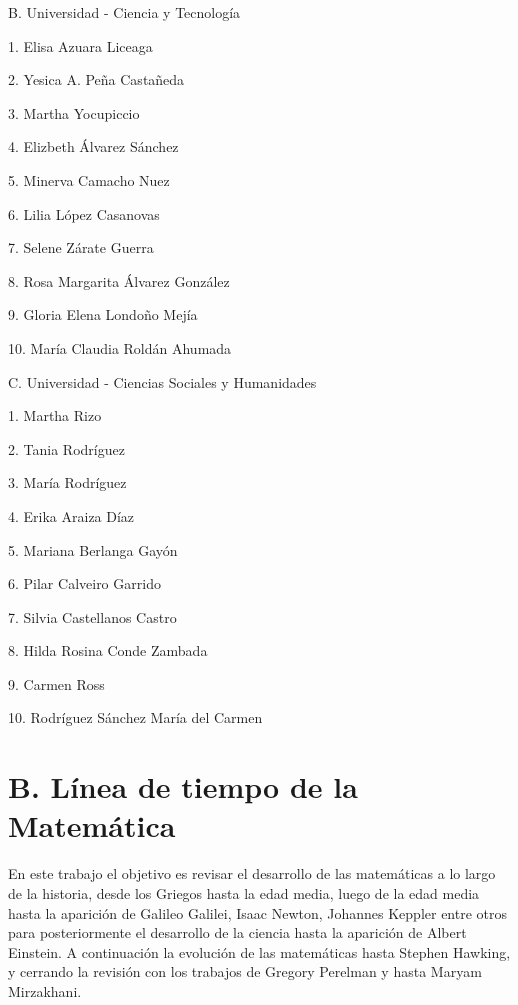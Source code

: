 \documentclass[]{book}
\begin{document}
B. Universidad - Ciencia y Tecnología

\begin{multicols}{2}

      1. Elisa Azuara Liceaga
  
      2. Yesica A. Peña Castañeda
  
      3. Martha Yocupiccio
  
      4. Elizbeth Álvarez Sánchez
  
      5. Minerva Camacho Nuez
  
      6. Lilia López Casanovas
  
      7. Selene Zárate Guerra
  
      8. Rosa Margarita Álvarez González 
  
      9. Gloria Elena Londoño Mejía
  
      10. María Claudia Roldán Ahumada
\end{multicols}

C. Universidad - Ciencias Sociales y Humanidades

\begin{multicols}{2}

      1. Martha Rizo
  
      2. Tania Rodríguez
  
      3. María Rodríguez
  
      4. Erika Araiza Díaz
  
      5. Mariana Berlanga Gayón
  
      6. Pilar Calveiro Garrido
  
      7. Silvia Castellanos Castro
  
      8. Hilda Rosina Conde Zambada
  
      9. Carmen Ross
  
      10. Rodríguez Sánchez María del Carmen
\end{multicols}

\section{B. Línea de tiempo de la
Matemática}\label{b.-luxednea-de-tiempo-de-la-matemuxe1tica}

En este trabajo el objetivo es revisar el desarrollo de las matemáticas
a lo largo de la historia, desde los Griegos hasta la edad media, luego
de la edad media hasta la aparición de Galileo Galilei, Isaac Newton,
Johannes Keppler entre otros para posteriormente el desarrollo de la
ciencia hasta la aparición de Albert Einstein. A continuación la
evolución de las matemáticas hasta Stephen Hawking, y cerrando la
revisión con los trabajos de Gregory Perelman y hasta Maryam Mirzakhani.
\end{document}
